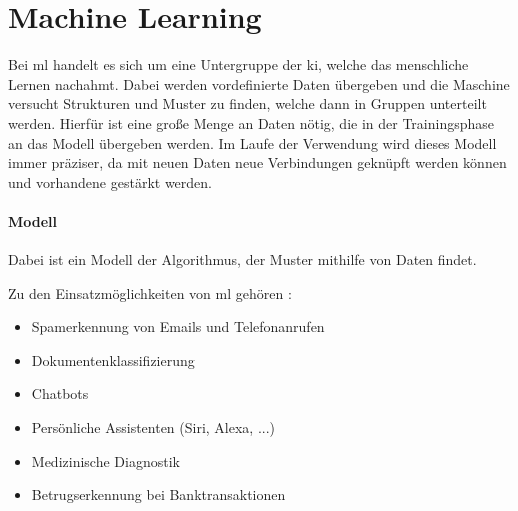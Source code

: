 \section{Machine Learning}

Bei \gls{ml} handelt es sich um eine Untergruppe der \gls{ki}, welche das menschliche Lernen nachahmt. Dabei werden vordefinierte Daten übergeben und die Maschine versucht Strukturen und Muster zu finden, welche dann in Gruppen unterteilt werden. Hierfür ist eine große Menge an Daten nötig, die in der Trainingsphase an das Modell übergeben werden. Im Laufe der Verwendung wird dieses Modell immer präziser, da mit neuen Daten neue Verbindungen geknüpft werden können und vorhandene gestärkt werden.

\paragraph{Modell} Dabei ist ein Modell der Algorithmus, der Muster mithilfe von Daten findet.

Zu den Einsatzmöglichkeiten von \gls{ml} gehören \cite{MLU}:

\begin{itemize}
    \item Spamerkennung von Emails und Telefonanrufen
    \item Dokumentenklassifizierung
    \item Chatbots
    \item Persönliche Assistenten (Siri, Alexa, ...)
    \item Medizinische Diagnostik
    \item Betrugserkennung bei Banktransaktionen
\end{itemize}










